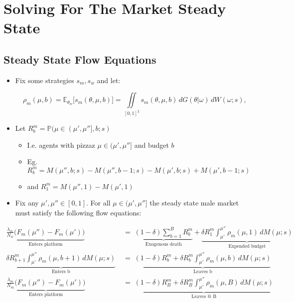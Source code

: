 \section{Solving For The Market Steady State}

\label{appx: Flux Sketch} 
\subsection{Steady State Flow Equations}
\begin{itemize}
    \item Fix some strategies $s_m,s_w$ and let:

\begin{equation*}
    \rho_m(\mu,b)=\mathbb{E}_{\theta_w}\Big[s_m(\theta,\mu,b)\Big]= \iint\limits_{[0,1]^2} s_m(\theta,\mu,b)\,dG(\theta|\omega)\,dW(\omega;s), 
\end{equation*}

    \item Let $R^m_b=\mathbb{P}(\mu \in(\mu',\mu''],b;s)$
    \begin{itemize}
        \item I.e. agents with pizzaz $\mu\in(\mu',\mu'']$ and budget $b$
        \item Eg. $R^m_b=M(\mu'',b;s)-M(\mu'',b-1;s)-M(\mu',b;s)+M(\mu',b-1;s)$
        \item and $R^m_1=M(\mu'',1)-M(\mu',1)$

    \end{itemize}
    
    \item Fix any $\mu',\mu''\in [0,1]$. For all $\mu\in(\mu',\mu'']$ the steady state male market must satisfy the following flow equations: 
    \end{itemize} 
    \begin{align}
        \underbrace{\frac{\lambda_m}{N_w}\Big(F_m(\mu'')-F_m(\mu')\Big)}_{\text{Enters platform}}&\;=\;\underbrace{(1-\delta)\sum^B_{b=1} R^m_b}_{\text{Exogenous death}}+\underbrace{\delta R^m_1 \int^{\mu''}_{\mu'}\rho_m(\mu,1)\,dM(\mu;s)}_{\text{Expended budget}} \label{flow1} \\[15pt]
        \underbrace{\delta R^m_{b+1} \int^{\mu''}_{\mu'}\rho_m(\mu,b+1)\,dM(\mu;s)}_{\text{Enters b}}&\;=\;\underbrace{(1-\delta) R^m_{b}+\delta R^m_{b} \int^{\mu''}_{\mu'}\rho_m(\mu,b)\,dM(\mu;s) }_{\text{Leaves b}} \label{flow2} \\[15pt]
        \underbrace{\frac{\lambda_m }{N_m}\Big(F_m(\mu'')-F_m(\mu')\Big)}_{\text{Enters platform}}&\;=\;\underbrace{(1-\delta)R^m_{B} + \delta R^m_{B} \int^{\mu''}_{\mu'}\rho_m(\mu,B)\,dM(\mu;s)}_{\text{Leaves @ B}} \label{flow3} \\[15pt]\nonumber
    \end{align}
    
